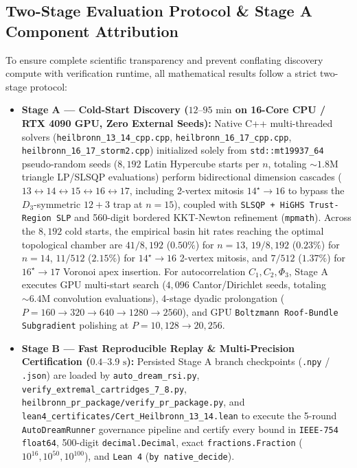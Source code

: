 \documentclass[11pt,a4paper]{article}
\begin{document}
\subsection{Two-Stage Evaluation Protocol \& Stage A Component Attribution}
\label{sec:stage_ab}

To ensure complete scientific transparency and prevent conflating discovery compute with verification runtime, all mathematical results follow a strict two-stage protocol:
\begin{itemize}
\item \textbf{Stage A --- Cold-Start Discovery ($12\text{--}95\text{ min}$ on 16-Core CPU / RTX 4090 GPU, Zero External Seeds):} Native C++ multi-threaded solvers (\texttt{heilbronn\_13\_14\_cpp.cpp}, \texttt{heilbronn\_16\_17\_cpp.cpp}, \texttt{heilbronn\_16\_17\_storm2.cpp}) initialized solely from \texttt{std::mt19937\_64} pseudo-random seeds ($8,192$ Latin Hypercube starts per $n$, totaling $\sim 1.8\text{M}$ triangle LP/SLSQP evaluations) perform bidirectional dimension cascades ($13 \leftrightarrow 14 \leftrightarrow 15 \leftrightarrow 16 \leftrightarrow 17$, including 2-vertex mitosis $14^\star \to 16$ to bypass the $D_3$-symmetric $12+3$ trap at $n=15$), coupled with \texttt{SLSQP + HiGHS Trust-Region SLP} and 560-digit bordered KKT-Newton refinement (\texttt{mpmath}). Across the $8,192$ cold starts, the empirical basin hit rates reaching the optimal topological chamber are $41/8,192$ ($0.50\%$) for $n=13$, $19/8,192$ ($0.23\%$) for $n=14$, $11/512$ ($2.15\%$) for $14^\star \to 16$ 2-vertex mitosis, and $7/512$ ($1.37\%$) for $16^\star \to 17$ Voronoi apex insertion. For autocorrelation $C_1, C_2, \Phi_3$, Stage A executes GPU multi-start search ($4,096$ Cantor/Dirichlet seeds, totaling $\sim 6.4\text{M}$ convolution evaluations), 4-stage dyadic prolongation ($P = 160 \to 320 \to 640 \to 1280 \to 2560$), and GPU \texttt{Boltzmann Roof-Bundle Subgradient} polishing at $P = 10,128 \to 20,256$.
\item \textbf{Stage B --- Fast Reproducible Replay \& Multi-Precision Certification ($0.4\text{--}3.9\text{ s}$):} Persisted Stage A branch checkpoints (\texttt{.npy} / \texttt{.json}) are loaded by \texttt{auto\_dream\_rsi.py}, \texttt{verify\_extremal\_cartridges\_7\_8.py}, \texttt{heilbronn\_pr\_package/verify\_pr\_package.py}, and \texttt{lean4\_certificates/Cert\_Heilbronn\_13\_14.lean} to execute the 5-round \texttt{AutoDreamRunner} governance pipeline and certify every bound in \texttt{IEEE-754 float64}, 500-digit \texttt{decimal.Decimal}, exact \texttt{fractions.Fraction} ($10^{16}, 10^{50}, 10^{100}$), and \texttt{Lean 4} (\texttt{by native\_decide}).

\end{itemize}
\end{document}
